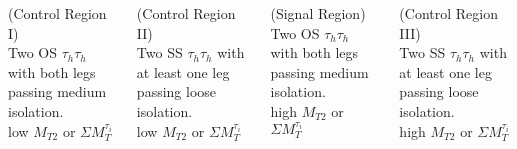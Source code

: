 \documentclass[professionalfont,fleqn]{beamer}
\begin{document}
\begin{footnotesize}
\begin{columns}[c]
\column{0.15\paperwidth}
\column{0.40\paperwidth}
\begin{tcolorbox}
\begin{center}
\color{red} (Control Region I) \\
\color{black} Two OS $\tau_{h}\tau_{h}$ with both legs passing medium isolation.\\
low $M_{T2}$ or $\Sigma M_T^{\tau_i}$
\end{center}
\end{tcolorbox}
\begin{tcolorbox}
\begin{center}
\color{red} (Control Region II) \\
\color{black} Two SS $\tau_{h}\tau_{h}$ with at least one leg passing loose isolation.\\
low $M_{T2}$ or $\Sigma M_T^{\tau_i}$
\end{center}
\end{tcolorbox}
\column{0.40\paperwidth}
\begin{tcolorbox}
\begin{center}
\color{red} (Signal Region) \\
\color{black} Two OS $\tau_{h}\tau_{h}$ with both legs passing medium isolation.\\
high $M_{T2}$ or $\Sigma M_T^{\tau_i}$
\end{center}
\end{tcolorbox}
\begin{tcolorbox}
\begin{center}
\color{red} (Control Region III) \\
\color{black} Two SS $\tau_{h}\tau_{h}$ with at least one leg passing loose isolation.\\
high $M_{T2}$ or $\Sigma M_T^{\tau_i}$
\end{center}
\end{tcolorbox}
\end{columns}
\end{footnotesize}
\end{document}
